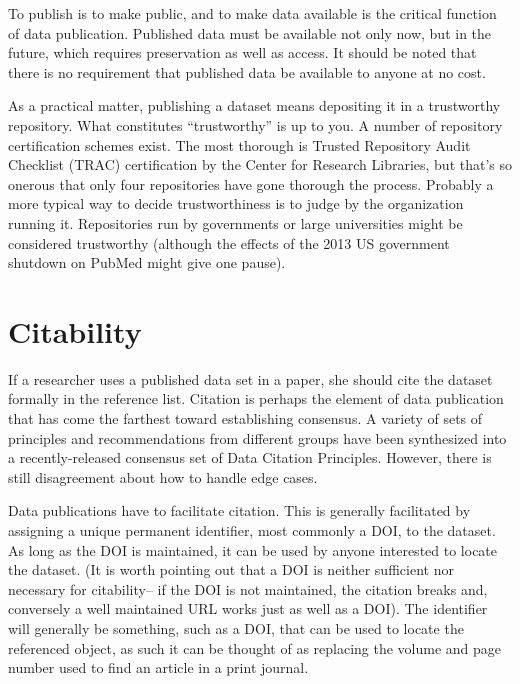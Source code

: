 \documentclass[10pt,a4paper,twocolumn]{article}
\begin{document}
To publish is to make public, and to make data available is the critical function of data publication. 
Published data must be available not only now, but in the future, which requires preservation as well as access. 
It should be noted that there is no requirement that published data be available to anyone at no cost.

As a practical matter, publishing a dataset means depositing it in a trustworthy repository. 
What constitutes ``trustworthy'' is up to you. 
A number of repository certification schemes exist. The most thorough is Trusted Repository Audit Checklist (TRAC)\cite{trac_2007} certification by the Center for Research Libraries, but that's so onerous that only four repositories have gone thorough the process. 
Probably a more typical way to decide trustworthiness is to judge by the organization running it. 
Repositories run by governments or large universities might be considered trustworthy (although the effects of the 2013 US government shutdown on PubMed might give one pause).


\section*{Citability}\label{citability}

If a researcher uses a published data set in a paper, she should cite the dataset formally in the reference list. 
Citation is perhaps the element of data publication that has come the farthest toward establishing consensus.
A variety of sets of principles and recommendations from different groups have been synthesized into a recently-released consensus set of Data Citation Principles. \cite{force11_data_2014} 
However, there is still disagreement about how to handle edge cases.

Data publications have to facilitate citation. 
This is generally facilitated by assigning a unique permanent identifier, most commonly a DOI, to the dataset. 
As long as the DOI is maintained, it can be used by anyone interested to locate the dataset. 
(It is worth pointing out that a DOI is neither sufficient nor necessary for citability-- if the DOI is not maintained, the citation breaks and, conversely a well maintained URL works just as well as a DOI). 
The identifier will generally be something, such as a DOI, that can be used to locate the referenced object, as such it can be thought of as replacing the volume and page number used to find an article in a print journal.
\end{document}
